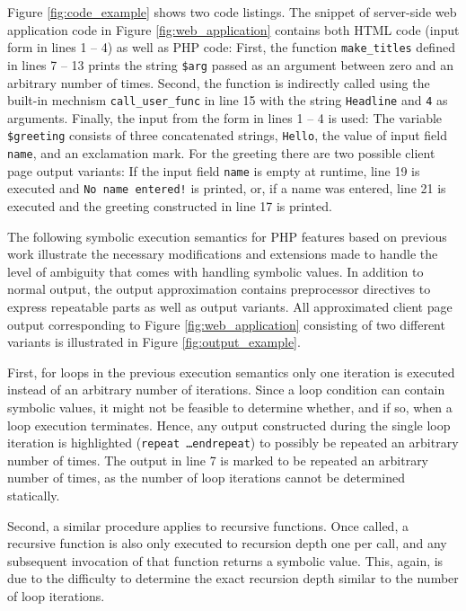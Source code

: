 \documentclass[sigconf]{acmart}
\begin{document}
Figure \ref{fig:code_example} shows two code listings. The snippet of server-side web
application code in Figure \ref{fig:web_application} contains both HTML code
(input form in lines 1 -- 4) as well as PHP code: First, the function
\texttt{make\_titles} defined in lines 7 – 13 prints the string \texttt{\$arg} passed as an argument between zero and an arbitrary number of
times. Second, the function is indirectly called using the built-in mechnism
\texttt{call\_user\_func} in line 15 with the string \texttt{Headline} and
\texttt{4} as arguments.  Finally, the input from the form in lines 1 – 4 is
used: The variable \texttt{\$greeting} consists of three concatenated strings,
\texttt{Hello}, the value of input field \texttt{name}, and an exclamation mark.
For the greeting there are two possible client page output
variants: If the input field \texttt{name} is empty at runtime, line 19 is
executed and \texttt{No name entered!} is printed, or, if a name was entered,
line 21 is executed and the greeting constructed in line 17 is printed.

The following symbolic execution semantics for PHP features based on
previous work \cite{Nguyen:2014:BCG:2635868.2635928} illustrate the necessary
modifications and extensions made to handle the level of ambiguity that comes with handling symbolic values. In addition to normal output, the
output approximation contains preprocessor directives to express
repeatable parts as well as output variants. All approximated client page
output corresponding to Figure \ref{fig:web_application} consisting of two different variants
is illustrated in Figure \ref{fig:output_example}.

First, for loops in the previous execution semantics
\cite{Nguyen:2014:BCG:2635868.2635928} only one iteration is executed instead of
an arbitrary number of iterations. Since a loop condition can contain symbolic
values, it might not be feasible to determine whether, and if so, when a loop
execution terminates. Hence, any output constructed during the single loop
iteration is highlighted (\texttt{repeat \ldots endrepeat}) to possibly be
repeated an arbitrary number of times. The output in line 7 is marked to be
repeated an arbitrary number of times, as the number of loop iterations cannot
be determined statically. 

Second, a similar procedure applies to recursive
functions. Once called, a recursive function is  also only executed to recursion
depth one per call, and any subsequent invocation of that function returns a
symbolic value. This, again, is due to the difficulty to determine the exact
recursion depth similar to the number of loop iterations.
\end{document}
